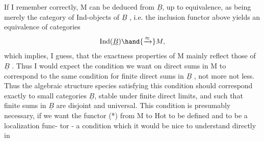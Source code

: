 If I remember correctly,  M can be deduced from $\underline{B}$,  up to equivalence,
as being merely the category of Ind-objects of $\underline{B}$ ,  i.e. the inclusion
functor above yields an equivalence of categories
\[ \mathrm{Ind}(\underline{B}) \hand{\xrightarrow{\approx}} M , \]
which implies, I guess,  that the exactness properties of M mainly
reflect those of $\underline{B}$ .  Thus I would expect the condition we want on direct
sums in M to correspond to the same condition for finite direct sums in
$\underline{B}$ ,  not more not less.  Thus the algebraic structure species satisfying
this condition should correspond exactly to small categories $\underline{B}$,  stable
under finite direct limits,  and such that finite sums in $\underline{B}$ are disjoint
and universal.   This condition is presumably necessary,  if we want the
functor (*) from M to Hot  to be defined and to be a localization func-%
tor  -   a condition which it would be nice to understand directly in 
